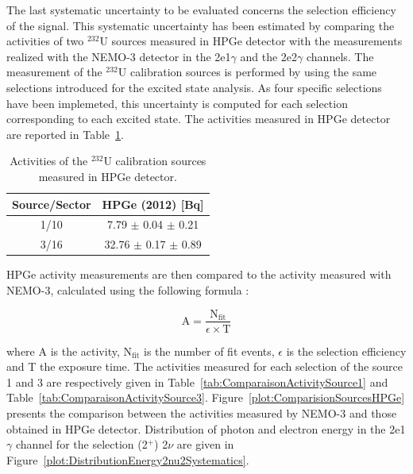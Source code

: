 \documentclass[main.tex]{subfiles}
\begin{document}
\NI The last systematic uncertainty to be evaluated concerns the selection efficiency of the signal. This systematic uncertainty has been estimated by comparing the activities of two $^{\text{232}}$U sources measured in HPGe detector with the measurements realized with the NEMO-3 detector in the 2e1$\gamma$ and the 2e2$\gamma$ channels. The measurement of the $^{\text{232}}$U calibration sources is performed by using the same selections introduced for the excited state analysis. As four specific selections have been implemeted, this uncertainty is computed for each selection corresponding to each excited state. The activities measured in HPGe detector are reported in Table~\ref{tab:HPGeMeasurementU232}.


\begin{table}[h!]
\centering
\begin{tabular}{c|c}
Source/Sector & HPGe (2012) [Bq]   \\[0.1cm]
\hline
1/10          & 7.79  $\pm$ 0.04 $\pm$ 0.21 \\ [0.1cm]
3/16          & 32.76 $\pm$ 0.17 $\pm$ 0.89 \\ [0.1cm]
\hline
\end{tabular}
\caption{Activities of the $^{\text{232}}$U calibration sources measured in HPGe detector.}
\label{tab:HPGeMeasurementU232}
\end{table}  


\bigskip


\NI HPGe activity measurements are then compared to the activity measured with NEMO-3, calculated using the following formula :


\begin{equation}
\text{A} = \frac{\text{N}_{\text{fit}}}{\epsilon \times \text{T}}
\end{equation}


\NI where A is the activity, N$_{\text{fit}}$ is the number of fit events, $\epsilon$ is the selection efficiency and T the exposure time. The activities measured for each selection of the source 1 and 3 are respectively given in Table~\ref{tab:ComparaisonActivitySource1} and Table~\ref{tab:ComparaisonActivitySource3}. Figure~\ref{plot:ComparisionSourcesHPGe} presents the comparison between the activities measured by NEMO-3 and those obtained in HPGe detector. Distribution of photon and electron energy in the 2e1$\gamma$ channel for the selection (2$^+$) 2$\nu$ are given in Figure~\ref{plot:DistributionEnergy2nu2Systematics}.
\end{document}
